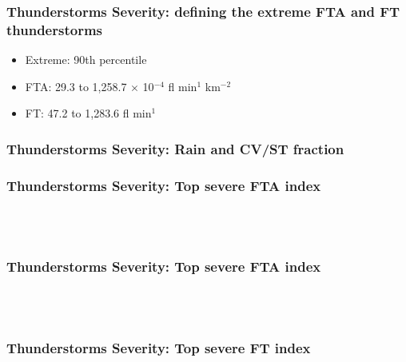 \documentclass[smaller]{beamer}
\begin{document}
\begin{frame}
\frametitle{Thunderstorms Severity: defining the extreme FTA and FT thunderstorms}
\begin{itemize}
\item Extreme: 90th percentile
\end{itemize}
\begin{itemize}
\item FTA: 29.3 to 1,258.7 $\times$ 10$^{-4}$ fl min$^{1}$ km$^{-2}$
\item  FT: 47.2 to 1,283.6 fl min$^{1}$
\end{itemize}

\end{frame}




\begin{frame}
\frametitle{Thunderstorms Severity: Rain and CV/ST fraction}

\end{frame}

\begin{frame}
\frametitle{Thunderstorms Severity: Top severe FTA index}
~~
\\
\\

\end{frame}


\begin{frame}
\frametitle{Thunderstorms Severity: Top severe FTA index}
~~
\\
\\

\end{frame}


\begin{frame}
\frametitle{Thunderstorms Severity: Top severe FT index}

~~
\\
\\

\end{frame}
\end{document}
